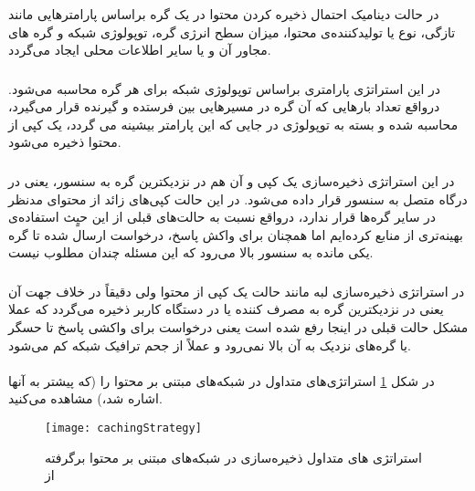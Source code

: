 در حالت دینامیک احتمال ذخیره کردن محتوا در یک گره براساس پارامترهایی مانند تازگی،‌ نوع یا تولیدکننده‌ی محتوا، میزان سطح انرژی گره، توپولوژی شبکه و گره های مجاور آن و یا سایر اطلاعات محلی ایجاد می‌گردد.

\subsubsection{}
در این استراتژی پارامتری براساس توپولوژی شبکه برای هر گره محاسبه می‌شود. درواقع تعداد بارهایی که آن گره در مسیرهایی بین فرستده و گیرنده قرار می‌گیرد، محاسبه شده و بسته به توپولوژی در جایی که این پارامتر بیشینه می گردد،‌ یک کپی از محتوا ذخیره می‌شود.

\subsubsection{}
در این استراتژی ذخیره‌سازی یک کپی و آن هم در نزدیکترین گره به سنسور، یعنی در درگاه متصل به سنسور قرار داده می‌شود. در این حالت کپی‌های زائد از محتوای مدنظر در سایر گره‌ها قرار ندارد، درواقع نسبت به حالت‌های قبلی از این حیٍث استفاده‌ی بهینه‌تری از منابع کرده‌ایم اما همچنان برای واکش پاسخ، درخواست ارسال شده تا گره یکی مانده به سنسور بالا می‌رود که این مسئله چندان مطلوب نیست.

\subsubsection{}
در استراتژی ذخیره‌سازی لبه مانند حالت  یک کپی از محتوا ولی دقیقاً در خلاف جهت آن یعنی در نزدیکترین گره به مصرف کننده یا در دستگاه کاربر ذخیره می‌گردد که عملا مشکل حالت قبلی در اینجا رفع شده است یعنی درخواست برای واکشی پاسخ تا حسگر یا گره‌های نزدیک به آن بالا نمی‌رود و عملاً از جحم ترافیک شبکه کم می‌شود.

\paragraph{}
در شکل \ref{fig:cachingStrategy} استراتژی‌های متداول در شبکه‌های مبتنی بر محتوا را (که پیشتر به آنها اشاره شد،) مشاهده می‌کنید.
\begin{figure}[ht]
	\centerline{\texttt{[image: cachingStrategy]}}
	\caption{استراتژی های متداول ذخیره‌سازی در شبکه‌های مبتنی بر محتوا برگرفته از\\ }
	\label{fig:cachingStrategy}
\end{figure}

